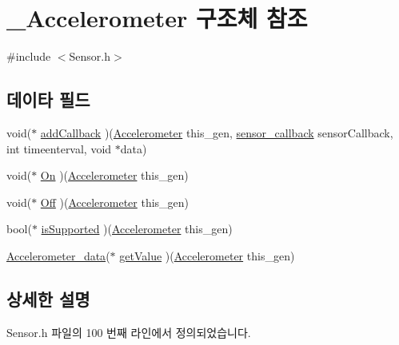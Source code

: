 \hypertarget{struct___accelerometer}{\section{\-\_\-\-Accelerometer 구조체 참조}
\label{struct___accelerometer}
}


{\ttfamily \#include $<$Sensor.\-h$>$}

\subsection*{데이타 필드}
\begin{DoxyCompactItemize}
\item 
void($\ast$ \hyperlink{struct___accelerometer_a7965ed0fc100c12c6c00f4fb85518f35}{add\-Callback} )(\hyperlink{_sensor_8h_a9ad3b9b652159c9011a7dc9023d0d914}{Accelerometer} this\-\_\-gen, \hyperlink{_sensor_8h_ad8114207845fc5e0aa30832f0c718cd6}{sensor\-\_\-callback} sensor\-Callback, int timeenterval, void $\ast$data)
\item 
void($\ast$ \hyperlink{struct___accelerometer_ad916cc9a71168f051a7cdfaf8da436ff}{On} )(\hyperlink{_sensor_8h_a9ad3b9b652159c9011a7dc9023d0d914}{Accelerometer} this\-\_\-gen)
\item 
void($\ast$ \hyperlink{struct___accelerometer_a6bee74ed7ad41e18037dd35d10e5ca65}{Off} )(\hyperlink{_sensor_8h_a9ad3b9b652159c9011a7dc9023d0d914}{Accelerometer} this\-\_\-gen)
\item 
bool($\ast$ \hyperlink{struct___accelerometer_a0c01b8a5a915f39afb4429cbe3ee6d2c}{is\-Supported} )(\hyperlink{_sensor_8h_a9ad3b9b652159c9011a7dc9023d0d914}{Accelerometer} this\-\_\-gen)
\item 
\hyperlink{_sensor_8h_aad4991bb642841f2928476723063a8c6}{Accelerometer\-\_\-data}($\ast$ \hyperlink{struct___accelerometer_a8c75dfb5dbc8f9da5ea69ef2fb597185}{get\-Value} )(\hyperlink{_sensor_8h_a9ad3b9b652159c9011a7dc9023d0d914}{Accelerometer} this\-\_\-gen)
\end{DoxyCompactItemize}


\subsection{상세한 설명}


Sensor.\-h 파일의 100 번째 라인에서 정의되었습니다.



